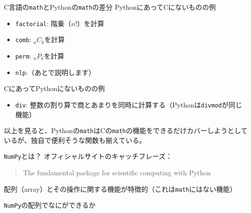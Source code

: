 \documentclass[unicode,lualatex]{beamer}
\begin{document}
\begin{frame}[fragile]{C言語の{\tt math}とPythonの{\tt math}の差分}
\noindent
PythonにあってCにないものの例
\begin{itemize}
\item \verb|factorial|: 階乗（$n!$）を計算
\item \verb|comb|: ${}_nC_k$を計算
\item \verb|perm|: ${}_nP_k$を計算
\item \verb|nlp|:（あとで説明します）
\end{itemize}
CにあってPythonにないものの例
\begin{itemize}
\item \verb|div|: 整数の割り算で商とあまりを同時に計算する（Pythonは\verb|divmod|が同じ機能）
\end{itemize}
以上を見ると、Pythonの\verb|math|はCの\verb|math|の機能をできるだけカバーしようとしているが、独自で便利そうな関数も揃えている。
\end{frame}
\begin{frame}[fragile]{{\tt NumPy}とは？}
  オフィシャルサイトのキャッチフレーズ：
  \begin{quote}
    The fundamental package for scientific computing with Python
  \end{quote}

  配列（array）とその操作に関する機能が特徴的（これは\verb|math|にはない機能）
\end{frame}
\begin{frame}[fragile]{{\tt NumPy}の配列でなにができるか}
\end{frame}
\end{document}
